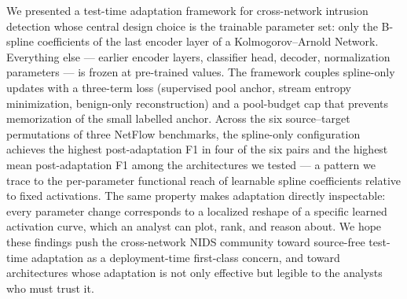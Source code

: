 \documentclass[10pt, conference, letterpaper]{IEEEtran}
\begin{document}
We presented a test-time adaptation framework for cross-network intrusion detection whose central design choice is the trainable parameter set: only the B-spline coefficients of the last encoder layer of a Kolmogorov--Arnold Network. Everything else --- earlier encoder layers, classifier head, decoder, normalization parameters --- is frozen at pre-trained values. The framework couples spline-only updates with a three-term loss (supervised pool anchor, stream entropy minimization, benign-only reconstruction) and a pool-budget cap that prevents memorization of the small labelled anchor. Across the six source--target permutations of three NetFlow benchmarks, the spline-only configuration achieves the highest post-adaptation F1 in four of the six pairs and the highest mean post-adaptation F1 among the architectures we tested --- a pattern we trace to the per-parameter functional reach of learnable spline coefficients relative to fixed activations. The same property makes adaptation directly inspectable: every parameter change corresponds to a localized reshape of a specific learned activation curve, which an analyst can plot, rank, and reason about. We hope these findings push the cross-network NIDS community toward source-free test-time adaptation as a deployment-time first-class concern, and toward architectures whose adaptation is not only effective but legible to the analysts who must trust it.



\end{document}
